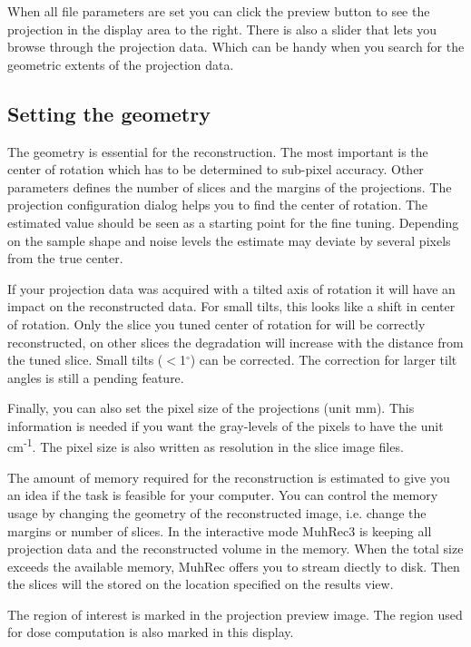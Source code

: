 \documentclass[a4paper]{scrreprt}
\begin{document}
When all file parameters are set you can click the preview button to see the projection in the display area to the right.
There is also a slider that lets you browse through the projection data. Which can be handy when you search for the geometric extents of the projection data.

\subsection{Setting the geometry}
The geometry is essential for the reconstruction. The most important is the center of rotation which has to be determined to sub-pixel accuracy. Other parameters defines the number of slices and the margins of the projections. The projection configuration dialog helps you to find the center of rotation. The estimated value should be seen as a starting point for the fine tuning. Depending on the sample shape and noise levels the estimate may deviate by several pixels from the true center. 

If your projection data was acquired with a tilted axis of rotation it will have an impact on the reconstructed data.
For small tilts, this looks like a shift in center of rotation. Only the slice you tuned center of rotation for will be correctly reconstructed, on other slices the degradation will increase with the distance from the tuned slice. 
Small tilts ($<$1$^{\circ}$) can be corrected. The correction for larger tilt angles is still a pending feature.

Finally, you can also set the pixel size of the projections (unit mm). This information is needed if you want the gray-levels of the pixels to have the unit cm\textsuperscript{-1}.
The pixel size is also written as resolution in the slice image files.

The amount of memory required for the reconstruction is estimated to give you an idea if the task is feasible for your computer. You can control the memory usage by changing the geometry of the reconstructed image, i.e. change the
margins or number of slices. In the interactive mode MuhRec3 is keeping all projection data and the reconstructed volume in the memory. When the total size exceeds the available memory, MuhRec offers you to stream diectly to disk. Then the slices will the stored on the location specified on the results view.

The region of interest is marked in the projection preview image. The region used for dose computation is also marked in this display.
\end{document}

